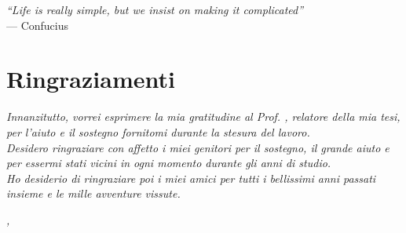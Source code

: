 \cleardoublepage
{}
{}

\begin{flushright}{
    \slshape
    ``Life is really simple, but we insist on making it complicated''} \\
    \medskip
    --- Confucius
\end{flushright}


\bigskip

\begingroup
\let\clearpage\relax
\let\cleardoublepage\relax
\let\cleardoublepage\relax

\chapter*{Ringraziamenti}
\noindent \textit{Innanzitutto, vorrei esprimere la mia gratitudine al Prof. \myProf, relatore della mia tesi, per l'aiuto e il sostegno fornitomi durante la stesura del lavoro.}\\

\noindent \textit{Desidero ringraziare con affetto i miei genitori per il sostegno, il grande aiuto e per essermi stati vicini in ogni momento durante gli anni di studio.}\\

\noindent \textit{Ho desiderio di ringraziare poi i miei amici per tutti i bellissimi anni passati insieme e le mille avventure vissute.}\\
\bigskip

\noindent\textit{\myLocation, \myTime}
\hfill \myName

\endgroup
